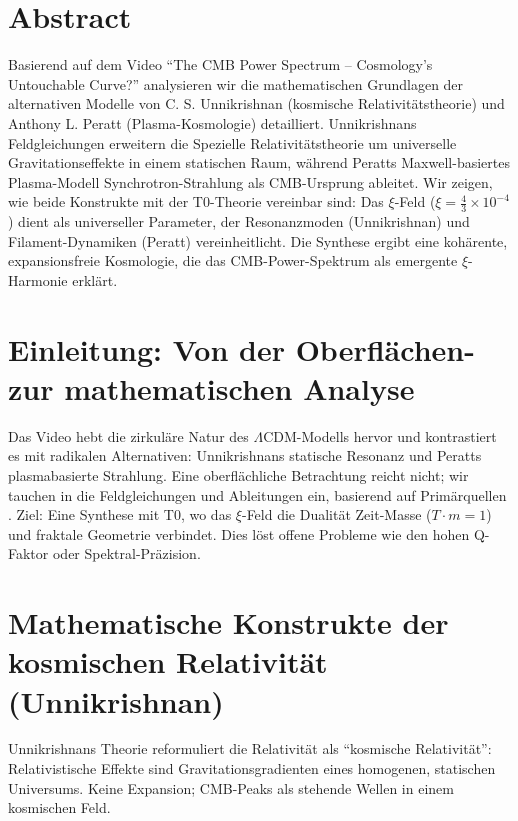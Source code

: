 \section*{Abstract}
		Basierend auf dem Video ``The CMB Power Spectrum -- Cosmology's Untouchable Curve?'' analysieren wir die mathematischen Grundlagen der alternativen Modelle von C. S. Unnikrishnan (kosmische Relativitätstheorie) und Anthony L. Peratt (Plasma-Kosmologie) detailliert. Unnikrishnans Feldgleichungen erweitern die Spezielle Relativitätstheorie um universelle Gravitationseffekte in einem statischen Raum, während Peratts Maxwell-basiertes Plasma-Modell Synchrotron-Strahlung als CMB-Ursprung ableitet. Wir zeigen, wie beide Konstrukte mit der T0-Theorie vereinbar sind: Das $\xi$-Feld ($\xi = \frac{4}{3} \times 10^{-4}$) dient als universeller Parameter, der Resonanzmoden (Unnikrishnan) und Filament-Dynamiken (Peratt) vereinheitlicht. Die Synthese ergibt eine kohärente, expansionsfreie Kosmologie, die das CMB-Power-Spektrum als emergente $\xi$-Harmonie erklärt.

	\section{Einleitung: Von der Oberflächen- zur mathematischen Analyse}
	Das Video \cite{video2025} hebt die zirkuläre Natur des $\Lambda$CDM-Modells hervor und kontrastiert es mit radikalen Alternativen: Unnikrishnans statische Resonanz und Peratts plasmabasierte Strahlung. Eine oberflächliche Betrachtung reicht nicht; wir tauchen in die Feldgleichungen und Ableitungen ein, basierend auf Primärquellen \cite{unnikrishnan2004, peratt1992}. Ziel: Eine Synthese mit T0, wo das $\xi$-Feld die Dualität Zeit-Masse ($T \cdot m = 1$) und fraktale Geometrie verbindet. Dies löst offene Probleme wie den hohen Q-Faktor oder Spektral-Präzision.
	\section{Mathematische Konstrukte der kosmischen Relativität (Unnikrishnan)}
	Unnikrishnans Theorie \cite{unnikrishnan2004} reformuliert die Relativität als ``kosmische Relativität'': Relativistische Effekte sind Gravitationsgradienten eines homogenen, statischen Universums. Keine Expansion; CMB-Peaks als stehende Wellen in einem kosmischen Feld.
